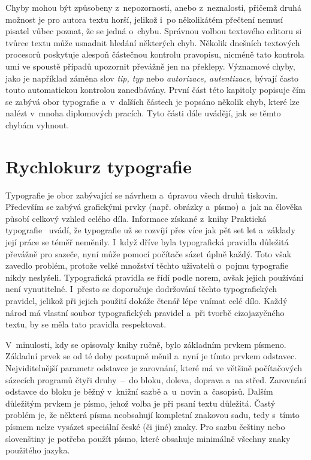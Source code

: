 Chyby mohou být způsobeny z~nepozornosti, anebo z~neznalosti, přičemž druhá možnost
je pro autora textu horší, jelikož i~po několikátém přečtení nemusí pisatel vůbec
poznat, že se jedná o~chybu. Správnou volbou textového editoru si tvůrce textu
může usnadnit hledání některých chyb. Několik dnešních textových procesorů poskytuje
alespoň částečnou kontrolu pravopisu, nicméně tato kontrola umí ve spoustě případů
upozornit převážně jen na překlepy. Významové chyby, jako je například záměna slov
\emph{tip, typ} nebo \emph{autorizace, autentizace}, bývají často touto
automatickou kontrolou zanedbávány. První část této kapitoly popisuje
čím se zabývá obor typografie a~v~dalších částech je popsáno několik
chyb, které lze nalézt v~mnoha diplomových pracích. Tyto části dále uvádějí,
jak se těmto chybám vyhnout.


\section{Rychlokurz typografie}
Typografie je obor zabývající se návrhem a~úpravou všech druhů tiskovin.
Především se zabývá grafickými prvky (např. obrázky a~písmo) a~jak na člověka
působí celkový vzhled celého díla.
Informace získané z~knihy Praktická typografie~\cite{Prakticka_typografie}
uvádí, že typografie už se rozvíjí přes více jak pět set
let a~základy její práce se téměř neměnily. I~když dříve byla typografická
pravidla důležitá převážně pro sazeče, nyní může pomocí počítače sázet
úplně každý. Toto však zavedlo problém, protože velké množství těchto
uživatelů o~pojmu typografie nikdy neslyšeli. Typografická pravidla se řídí podle
norem, avšak jejich používání není vynutitelné. I~přesto se doporučuje
dodržování těchto typografických pravidel, jelikož při jejich použití
dokáže čtenář lépe vnímat celé dílo. Každý národ má vlastní
soubor typografických pravidel a~při tvorbě cizojazyčného textu, by se
měla tato pravidla respektovat.

V~minulosti, kdy se opisovaly knihy ručně, bylo základním prvkem písmeno. 
Základní prvek se od té doby postupně měnil a~nyní je tímto prvkem odstavec.
Nejviditelnější parametr odstavce je zarovnání, které má ve většině 
počítačových sázecích programů čtyři druhy~--~do bloku, doleva, doprava 
a~na střed. Zarovnání odstavce do bloku je běžný v~knižní sazbě a~u~novin
a~časopisů. Dalším důležitým prvkem je písmo, jehož volba je při psaní textu
důležitá. Častý problém je, že některá písma neobsahují kompletní znakovou
sadu, tedy s~tímto písmem nelze vysázet speciální české (či jiné) znaky.
Pro sazbu češtiny nebo slovenštiny je potřeba použít písmo, které obsahuje
minimálně všechny znaky použitého jazyka.

